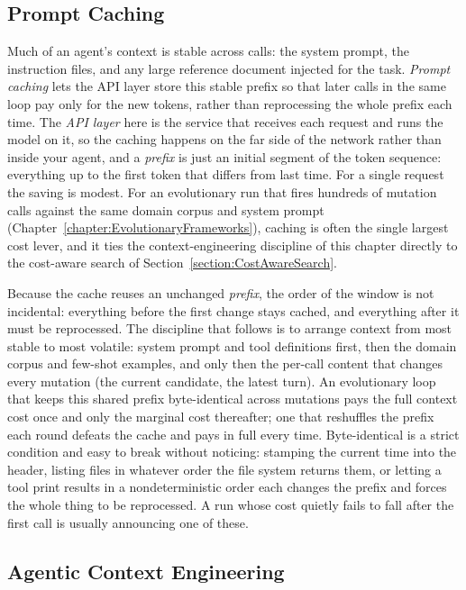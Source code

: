 \subsection{Prompt Caching}

Much of an agent's context is stable across calls: the system prompt, the instruction files, and any large reference document injected for the task.
\emph{Prompt caching} lets the API layer store this stable prefix so that later calls in the same loop pay only for the new tokens, rather than reprocessing the whole prefix each time.
The \emph{API layer} here is the service that receives each request and runs the model on it, so the caching happens on the far side of the network rather than inside your agent, and a \emph{prefix} is just an initial segment of the token sequence: everything up to the first token that differs from last time.
For a single request the saving is modest.
For an evolutionary run that fires hundreds of mutation calls against the same domain corpus and system prompt (Chapter~\ref{chapter:EvolutionaryFrameworks}), caching is often the single largest cost lever, and it ties the context-engineering discipline of this chapter directly to the cost-aware search of Section~\ref{section:CostAwareSearch}.

Because the cache reuses an unchanged \emph{prefix}, the order of the window is not incidental: everything before the first change stays cached, and everything after it must be reprocessed.
The discipline that follows is to arrange context from most stable to most volatile: system prompt and tool definitions first, then the domain corpus and few-shot examples, and only then the per-call content that changes every mutation (the current candidate, the latest turn).
An evolutionary loop that keeps this shared prefix byte-identical across mutations pays the full context cost once and only the marginal cost thereafter; one that reshuffles the prefix each round defeats the cache and pays in full every time.
Byte-identical is a strict condition and easy to break without noticing: stamping the current time into the header, listing files in whatever order the file system returns them, or letting a tool print results in a nondeterministic order each changes the prefix and forces the whole thing to be reprocessed.
A run whose cost quietly fails to fall after the first call is usually announcing one of these.

\subsection{Agentic Context Engineering}
\label{subsection:AgenticContextEng}

